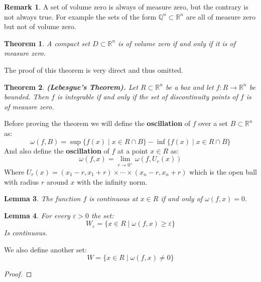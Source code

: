 \documentclass[11pt,a4paper]{article}
\theoremstyle{definition}
\newtheorem{remark}{Remark}[section]
\theoremstyle{plain}
\newtheorem{theorem}{Theorem}[section]
\newtheorem{lemma}[theorem]{Lemma}
\newcommand{\Q}{\mathbb{Q}}
\newcommand{\R}{\mathbb{R}}
\renewcommand{\tt}[1]{\textnormal{\textbf{(#1).}}} %
\begin{document}
	\begin{remark}
		A set of volume zero is always of measure zero, but the
		contrary is not always true. For example the sets of the
		form $\Q^n \subset \R^n$ are all of measure zero but not
		of volume zero.
	\end{remark}
	\begin{theorem}
		A compact set $D \subset \R^n$ is of volume zero if and only
		if it is of measure zero.
	\end{theorem}
	The proof of this theorem is very direct and thus omitted.
	\begin{theorem}
		\tt{Lebesgue's Theorem} Let $R \subset \R^n$ be 
		a box and let $f \colon R \to \R^n$ be bounded. Then $f$ is integrable
		if and only if the set of discontinuity points of $f$ is of 
		meausre zero.
	\end{theorem}
	\noindent
	Before proving the theorem we will define the \textbf{oscillation}
	of $f$ over a set $B \subset \R^n$ as:
	\[
		\omega(f,B) = 
		\sup\{f(x) \mid x \in R \cap B\} -
		\inf\{f(x) \mid x \in R \cap B\}
	\]
	And also define the \textbf{oscillation} of $f$ at a point 
	$x \in R$ as:
	\[
		\omega(f,x) = \lim_{r \to 0^+}{\omega(f,U_r(x))}
	\]
	Where $U_r(x) = (x_1-r,x_1+r) \times \cdots \times (x_n-r,x_n+r)$
	which is the open ball with radius $r$ around $x$ with the
	infinity norm.
	\begin{lemma}
		The function $f$ is continuous at $x \in R$ if and only of
		$\omega(f,x) = 0$.
	\end{lemma}
	\begin{lemma}
		For every $\varepsilon > 0$ the set:
		\[
			W_\varepsilon = 
			\{x \in R \mid \omega(f,x) \geq \varepsilon\}
		\]
		Is continuous.
	\end{lemma}
	We also define another set:
	\[
		W = \{x \in R \mid \omega(f,x) \neq 0\}		
	\]
	\begin{proof}
	\end{proof}
	
\end{document}
